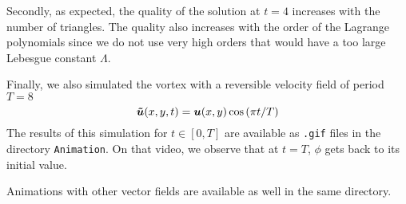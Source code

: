 \documentclass[11 pt]{article}
\begin{document}
Secondly, as expected, the quality of the solution at $t=4$ increases with the number of triangles. The quality also increases with the order of the Lagrange polynomials since we do not use very high orders that would have a too large Lebesgue constant $\Lambda$.

Finally, we also simulated the vortex with a reversible velocity field of period $T=8$
\[
\bm{\Tilde{u}}(x,y,t) = \bm{u}(x, y) \cos{(\pi t / T)}
\]
The results of this simulation for $t \in [0,T]$ are available as \texttt{.gif} files in the directory \texttt{Animation}. On that video, we observe that at $t=T$, $\phi$ gets back to its initial value.

Animations with other vector fields are available as well in the same directory.

\nocite{*}
\printbibliography
\end{document}

